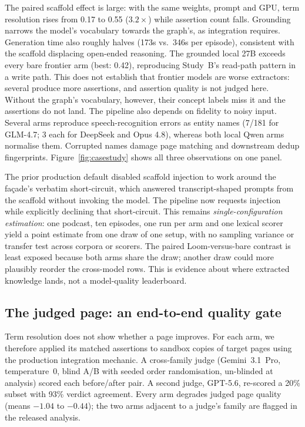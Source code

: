 \documentclass[10pt,twocolumn]{article}
\begin{document}
The paired scaffold effect is large: with the same weights, prompt and GPU, term resolution
rises from 0.17 to 0.55 ($3.2\times$) while assertion count falls. Grounding narrows the model's
vocabulary towards the graph's, as integration requires. Generation time also roughly halves
(173s vs.\ 346s per episode), consistent with the scaffold displacing open-ended reasoning.
The grounded local 27B exceeds every bare frontier arm (best: 0.42), reproducing Study~B's
read-path pattern in a write path. This does not establish that frontier models are worse
extractors: several produce more assertions, and assertion quality is not judged here. Without
the graph's vocabulary, however, their concept labels miss it and the assertions do not land.
The pipeline also depends on fidelity to noisy input. Several arms reproduce speech-recognition
errors as entity names (7/181 for GLM-4.7; 3 each for DeepSeek and Opus 4.8), whereas both local
Qwen arms normalise them. Corrupted names damage page matching and downstream dedup
fingerprints. Figure~\ref{fig:casestudy} shows all three observations on one panel.



The prior production default disabled scaffold injection to work around the fa\c{c}ade's
verbatim short-circuit, which answered transcript-shaped prompts from the scaffold without
invoking the model. The pipeline now requests injection while explicitly declining that
short-circuit. This remains \emph{single-configuration estimation}: one podcast, ten episodes,
one run per arm and one lexical scorer yield a point estimate from one draw of one setup, with
no sampling variance or transfer test across corpora or scorers. The paired Loom-versus-bare
contrast is least exposed because both arms share the draw; another draw could more plausibly
reorder the cross-model rows. This is evidence about where extracted knowledge lands, not a
model-quality leaderboard.

\subsection{The judged page: an end-to-end quality gate}\label{sec:pagejudge}
Term resolution does not show whether a page improves. For each arm, we therefore applied its
matched assertions to sandbox copies of target pages using the production integration mechanic.
A cross-family judge (Gemini~3.1~Pro, temperature~0, blind A/B with seeded order randomisation,
un-blinded at analysis) scored each before/after pair. A second judge, GPT-5.6, re-scored a
20\% subset with 93\% verdict agreement. Every arm degrades judged page quality (means $-1.04$
to $-0.44$); the two arms adjacent to a judge's family are flagged in the released analysis.
\end{document}
